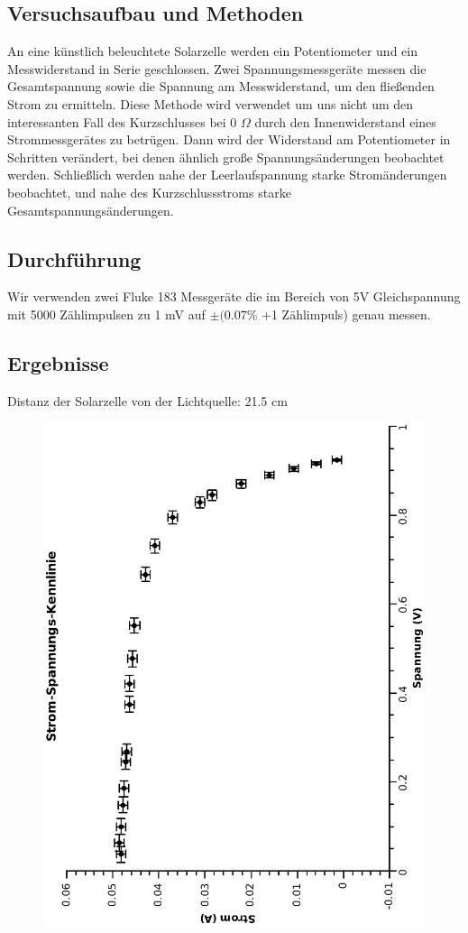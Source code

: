 \documentclass{article}
\begin{document}
\subsection{Versuchsaufbau und Methoden}
An eine künstlich beleuchtete Solarzelle werden ein Potentiometer und ein Messwiderstand in Serie geschlossen. Zwei Spannungsmessgeräte messen die Gesamtspannung sowie die Spannung am Messwiderstand, um den fließenden Strom zu ermitteln. Diese Methode wird verwendet um uns nicht um den interessanten Fall des Kurzschlusses bei 0 $\Omega$ durch den Innenwiderstand eines Strommessgerätes zu betrügen. Dann wird der Widerstand am Potentiometer in Schritten verändert, bei denen ähnlich große Spannungsänderungen beobachtet werden. Schließlich werden nahe der Leerlaufspannung starke Stromänderungen beobachtet, und nahe des Kurzschlussstroms starke Gesamtspannungsänderungen.
\subsection{Durchführung}
Wir verwenden zwei Fluke 183 Messgeräte die im Bereich von 5V Gleichspannung mit 5000 Zählimpulsen zu 1 mV auf $\pm (0.07\%$ +1 Zählimpuls) genau messen.
\subsection{Ergebnisse}
Distanz der Solarzelle von der Lichtquelle: 21.5 cm\\
\begin{center}
\begin{figure}
\includegraphics[scale=0.7,angle=-90]{stromspannungsolar.eps}
\end{figure}
\end{center}
\end{document}
